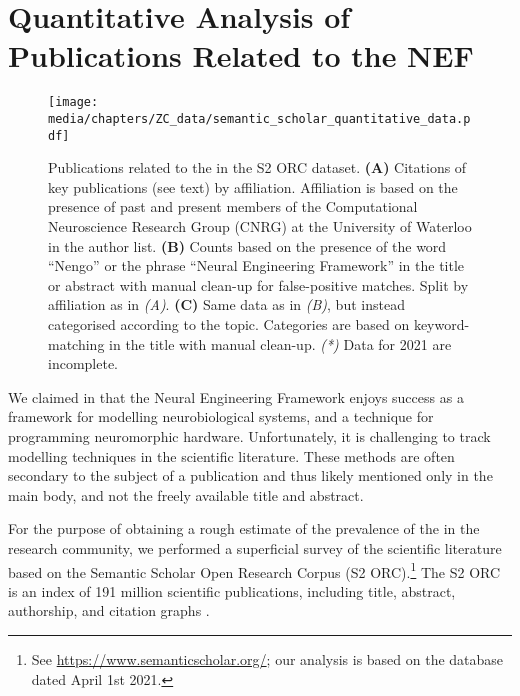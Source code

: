 
\section{Quantitative Analysis of Publications Related to the NEF}
\label{app:nef_literature}

\begin{figure}[p]
	\centering
	\texttt{[image: media/chapters/ZC\_data/semantic\_scholar\_quantitative\_data.pdf]}%
	{\label{fig:nef_literature_a}}%
	{\label{fig:nef_literature_b}}%
	{\label{fig:nef_literature_c}}%
	\caption[Publications related to the NEF in the S2 ORC dataset]{Publications related to the \NEF in the S2 ORC dataset.
	\textbf{(A)} Citations of key \NEF publications (see text) by affiliation. Affiliation is based on the presence of past and present members of the Computational Neuroscience Research Group (CNRG) at the University of Waterloo in the author list.
	\textbf{(B)} Counts based on the presence of the word \enquote{Nengo} or the phrase \enquote{Neural Engineering Framework} in the title or abstract with manual clean-up for false-positive matches. Split by affiliation as in \emph{(A)}.
	\textbf{(C)} Same data as in \emph{(B)}, but instead categorised according to the topic. Categories are based on keyword-matching in the title with manual clean-up.
	\emph{(*)} Data for 2021 are incomplete.}
	\label{fig:nef_literature}
\end{figure}

We claimed in  that the Neural Engineering Framework enjoys success as a framework for modelling neurobiological systems, and a technique for programming neuromorphic hardware.
Unfortunately, it is challenging to track modelling techniques in the scientific literature.
These methods are often secondary to the subject of a publication and thus likely mentioned only in the main body, and not the freely available title and abstract.

For the purpose of obtaining a rough estimate of the prevalence of the \NEF in the research community, we performed a superficial survey of the scientific literature based on the Semantic Scholar Open Research Corpus (S2 ORC).\footnote{See \url{https://www.semanticscholar.org/}; our analysis is based on the database dated April 1st 2021.}
The S2 ORC is an index of 191 million scientific publications, including title, abstract, authorship, and citation graphs \citep{ammar2018construction}.

